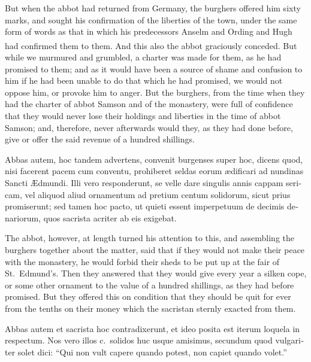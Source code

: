 \documentclass{book}
\newcounter{engnote}
\newcommand{\engnotenum}{\textsuperscript{\arabic{engnote}\stepcounter{engnote}}}
\begin{document}
\begin{paracol}{2}
But when the abbot had returned from Germany, the burghers offered him sixty marks, and sought his confirmation of the liberties of the town, under the same form of words as that in which his predecessors Anselm and Ording and Hugh had confirmed them to them. And this also the abbot graciously conceded.\engnotenum{} But while we murmured and grumbled, a charter was made for them, as he had promised to them; and as it would have been a source of shame and confusion to him if he had been unable to do that which he had promised, we would not oppose him, or provoke him to anger. But the burghers, from the time when they had the charter of abbot Samson and of the monastery, were full of confidence that they would never lose their holdings and liberties in the time of abbot Samson; and, therefore, never afterwards would they, as they had done before, give or offer the said revenue of a hundred shillings.

\switchcolumn*

\begin{otherlanguage}{latin}
Abbas autem, hoc tandem advertens, convenit burgenses super hoc, dicens quod, nisi facerent pacem cum conventu, prohiberet seldas eorum \ae{}dificari ad nundinas Sancti \AE{}dmundi. Illi vero responderunt, se velle dare singulis annis cappam sericam, vel aliquod aliud ornamentum ad pretium centum solidorum, sicut prius promiserunt; sed tamen hoc pacto, ut quieti essent imperpetuum de decimis denariorum, quos sacrista acriter ab eis exigebat.
\end{otherlanguage}

\switchcolumn

The abbot, however, at length turned his attention to this, and assembling the burghers together about the matter, said that if they would not make their peace with the monastery, he would forbid their sheds to be put up at the fair of St.\ Edmund's. Then they answered that they would give every year a silken cope, or some other ornament to the value of a hundred shillings, as they had before promised. But they offered this on condition that they should be quit for ever from the tenths on their money which the sacristan sternly exacted from them.

\switchcolumn*

\begin{otherlanguage}{latin}
Abbas autem et sacrista hoc contradixerunt, et ideo posita est iterum loquela in respectum. Nos vero illos c.\ solidos huc usque amisimus, secundum quod vulgariter solet dici: ``Qui non vult capere quando potest, non capiet quando volet.''
\end{otherlanguage}


\end{paracol}
\end{document}
